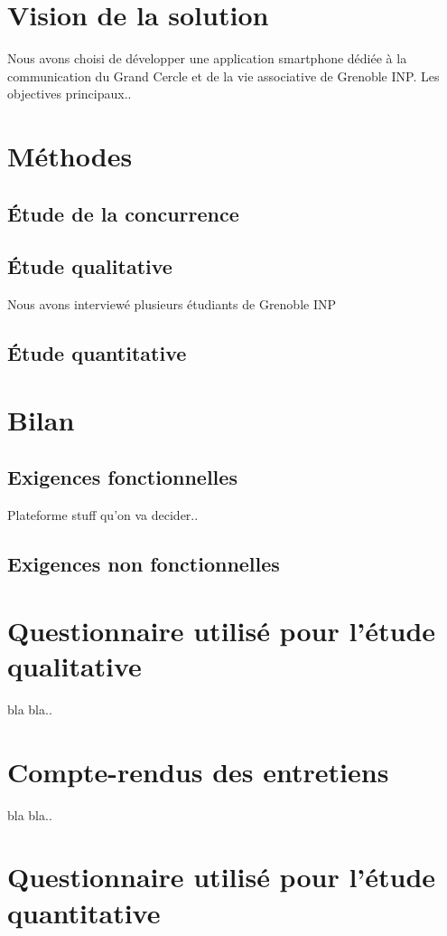 \documentclass[a4paper, 11px]{article}
\begin{document}
\newpage


\section{Vision de la solution}
Nous avons choisi de développer une application smartphone dédiée à la communication du Grand Cercle et de la vie associative de Grenoble INP. Les objectives principaux..

\newpage

\section{Méthodes}

\subsection{Étude de la concurrence}

\subsection{Étude qualitative}
Nous avons interviewé plusieurs étudiants de Grenoble INP

\subsection{Étude quantitative}

\newpage

\section{Bilan}

\subsection{Exigences fonctionnelles}

Plateforme
stuff qu'on va decider..

\subsection{Exigences non fonctionnelles}


\appendix
\addappheadtotoc

\newpage

\section{Questionnaire utilisé pour l'étude qualitative}

bla bla..
\newpage

\section{Compte-rendus des entretiens}

bla bla..
\newpage

\section{Questionnaire utilisé pour l'étude quantitative}
\end{document}
